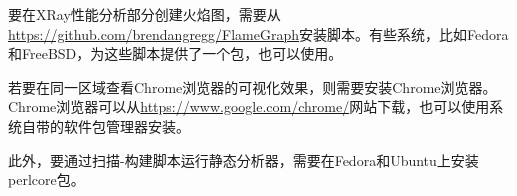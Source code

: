 要在XRay性能分析部分创建火焰图，需要从\url{https://github.com/brendangregg/FlameGraph}安装脚本。有些系统，比如Fedora和FreeBSD，为这些脚本提供了一个包，也可以使用。

若要在同一区域查看Chrome浏览器的可视化效果，则需要安装Chrome浏览器。Chrome浏览器可以从\url{https://www.google.com/chrome/}网站下载，也可以使用系统自带的软件包管理器安装。

此外，要通过扫描-构建脚本运行静态分析器，需要在Fedora和Ubuntu上安装perlcore包。